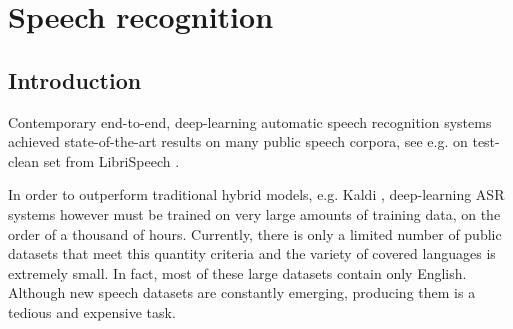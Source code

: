 \chapter{Speech recognition}
\label{chapter:asr}


\section{Introduction}



Contemporary end-to-end, deep-learning automatic speech recognition systems achieved state-of-the-art results on many public speech corpora, see e.g. 
on test-clean set from LibriSpeech .

In order to outperform traditional hybrid models, e.g. Kaldi , deep-learning ASR systems however must be trained on very large amounts of training data, on the order of a thousand of hours. Currently, there is only a limited number of public datasets that meet this quantity criteria and the variety of covered languages is extremely small. In fact, most of these large datasets contain only English. Although new speech datasets are constantly emerging, producing them is a tedious and expensive task.

